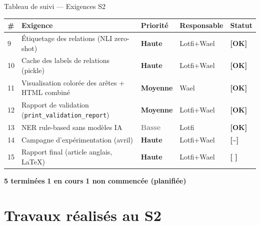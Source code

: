 \documentclass[aspectratio=169]{beamer}
\newcommand{\done}{\textcolor{done}{\textbf{[OK]}}}
\newcommand{\inprog}{\textcolor{inprog}{\textbf{[\textasciitilde]}}}
\newcommand{\notdone}{\textcolor{nottodo}{\textbf{[ ]}}}
\newcommand{\high}{\textcolor{red!80!black}{\textbf{Haute}}}
\newcommand{\med}{\textcolor{orange!80!black}{\textbf{Moyenne}}}
\newcommand{\low}{\textcolor{gray}{\textbf{Basse}}}
\begin{document}
\begin{frame}{Tableau de suivi --- Exigences S2}
  \footnotesize
  \setlength{\tabcolsep}{4pt}
  \renewcommand{\arraystretch}{1.25}
  \begin{tabularx}{\textwidth}{>{\centering\arraybackslash}p{0.4cm}
                               X
                               >{\centering\arraybackslash}p{1.5cm}
                               >{\centering\arraybackslash}p{1.8cm}
                               >{\centering\arraybackslash}p{1.5cm}}
    \toprule
    \textbf{\#} & \textbf{Exigence} & \textbf{Priorité} & \textbf{Responsable} & \textbf{Statut} \\
    \midrule
    \rowcolor{rowdone}9  & Étiquetage des relations (NLI zero-shot)          & \high & Lotfi+Wael & \done \\
    \rowcolor{rowdone}10 & Cache des labels de relations (pickle)            & \high & Lotfi+Wael & \done \\
    \rowcolor{rowdone}11 & Visualisation colorée des arêtes + HTML combiné   & \med  & Wael       & \done \\
    \rowcolor{rowdone}12 & Rapport de validation (\texttt{print\_validation\_report}) & \med & Lotfi+Wael & \done \\
    \rowcolor{rowdone}13 & NER rule-based sans modèles IA                   & \low  & Lotfi      & \done \\
    \rowcolor{rowinprog}14 & Campagne d'expérimentation (avril)              & \high & Lotfi+Wael & \inprog \\
    \rowcolor{rownot}15  & Rapport final (article anglais, \LaTeX)          & \high & Lotfi+Wael & \notdone \\
    \bottomrule
  \end{tabularx}
  \vspace{4pt}
  \small
  \textcolor{done}{\textbf{5 terminées}} \quad
  \textcolor{inprog}{\textbf{1 en cours}} \quad
  \textcolor{nottodo}{\textbf{1 non commencée (planifiée)}}
\end{frame}

\section{Travaux réalisés au S2}
\end{document}
